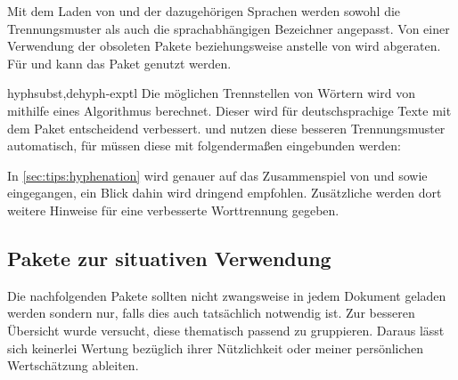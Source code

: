 \begin{packages}
  Mit dem Laden von  und der dazugehörigen Sprachen werden 
  sowohl die Trennungsmuster als auch die sprachabhängigen Bezeichner angepasst.
  Von einer Verwendung der obsoleten Pakete  beziehungsweise 
   anstelle von  wird abgeraten. Für 
   und  kann das Paket  
  genutzt werden.
\item[hyphsubst,dehyph-exptl]
  Die möglichen Trennstellen von Wörtern wird von  mithilfe 
  eines Algorithmus berechnet. Dieser wird für deutschsprachige Texte mit dem 
  Paket  entscheidend verbessert.  und 
   nutzen diese besseren Trennungsmuster automatisch, für 
   müssen diese mit folgendermaßen eingebunden werden:
  \begin{Code}
    \usepackage[ngerman=ngerman-x-latest]{hyphsubst}
  \end{Code}\vspace{-\baselineskip}%
  In \autoref{sec:tips:hyphenation} wird genauer auf das Zusammenspiel von 
   und  sowie  eingegangen, 
  ein Blick dahin wird dringend empfohlen. Zusätzliche werden dort weitere 
  Hinweise für eine verbesserte Worttrennung gegeben.
\end{packages}


\subsection{Pakete zur situativen Verwendung}
Die nachfolgenden Pakete sollten nicht zwangsweise in jedem Dokument geladen 
werden sondern nur, falls dies auch tatsächlich notwendig ist. Zur besseren 
Übersicht wurde versucht, diese thematisch passend zu gruppieren. Daraus lässt 
sich keinerlei Wertung bezüglich ihrer Nützlichkeit oder meiner persönlichen 
Wertschätzung ableiten.



